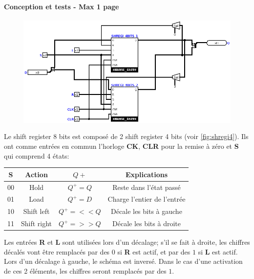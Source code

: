 \documentclass[a4paper]{article} %
\begin{document}
\begin{tcolorbox}[colframe=Monokaimagenta,colback=white]
\paragraph{Conception et tests - Max 1 page}
\begin{figure}[H]
    \centering
    \includegraphics[width=.8\textwidth]{src/SHREGI_8BITS.png}
    \label{fig:SHREGI_8}
\end{figure}

Le shift register 8 bits est composé de 2 shift register 4 bits (voir \ref{fig:shregi4}).  Ils ont comme entrées en commun l'horloge \textbf{CK}, \textbf{CLR} pour la remise à zéro et \textbf{S} qui comprend 4 états: 

\begin{center}
    \begin{tabular}{|c|c|c|c|}
        \hline
        S  & Action      & $Q+$        & Explications\\
        \hline
        00 & Hold        & $Q^+ = Q$   & Reste dans l'état passé \\
        01 & Load        & $Q^+ = D$   & Charge l'entier de l'entrée \\
        10 & Shift left  & $Q^+ = <<Q$ & Décale les bits à gauche \\
        11 & Shift right & $Q^+ = >>Q$ & Décale les bits à droite \\
        \hline    
    \end{tabular}    
\end{center}

Les entrées \textbf{R} et \textbf{L} sont utilisées lors d'un décalage; s'il se fait à droite, les chiffres décalés vont être remplacés par des $0$ si \textbf{R} est actif, et par des $1$ si \textbf{L} est actif. Lors d'un décalage à gauche, le schéma est inversé. Dans le cas d'une activation de ces 2 éléments, les chiffres seront remplacés par des $1$.\\


\end{tcolorbox}
\end{document}
